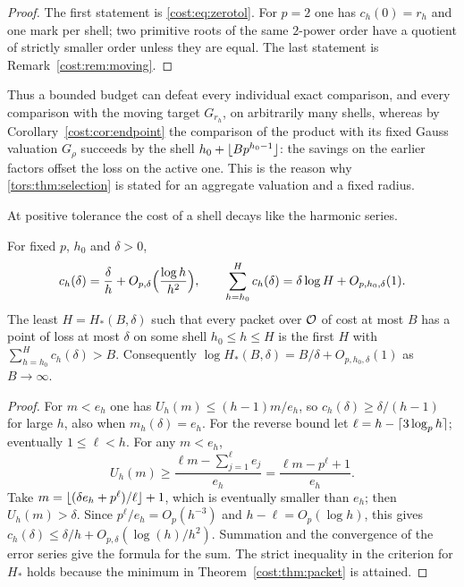 \begin{proof}
The first statement is \eqref{cost:eq:zerotol}. For $p=2$ one has $c_h(0)=r_h$ and one mark
per shell; two primitive roots of the same $2$-power order have a quotient of strictly
smaller order unless they are equal. The last statement is Remark~\ref{cost:rem:moving}.
\end{proof}

Thus a bounded budget can defeat every individual exact comparison, and every comparison
with the moving target $G_{r_h}$, on arbitrarily many shells, whereas by
Corollary~\ref{cost:cor:endpoint} the comparison of the product with its fixed Gauss valuation
$G_\rho$ succeeds by the shell $h_0+\lfloor Bp^{h_0-1}\rfloor$: the savings on the earlier factors
offset the loss on the active one. This is the reason why \cref{tors:thm:selection} is
stated for an aggregate valuation and a fixed radius.

At positive tolerance the cost of a shell decays like the harmonic series.

\begin{corollary}\label{cost:cor:depth}
For fixed $p$, $h_0$ and $\delta>0$,
\[
 c_h(\delta)=\frac\delta h+O_{p,\delta}\Bigl(\frac{\log h}{h^2}\Bigr),\qquad
 \sum_{h=h_0}^Hc_h(\delta)=\delta\log H+O_{p,h_0,\delta}(1).
\]
The least $H=H_*(B,\delta)$ such that every packet over $\mathcal{O}$ of cost at most $B$ has a point
of loss at most $\delta$ on some shell $h_0\le h\le H$ is the first $H$ with
$\sum_{h=h_0}^Hc_h(\delta)>B$. Consequently
$\log H_*(B,\delta)=B/\delta+O_{p,h_0,\delta}(1)$ as $B\to\infty$.
\end{corollary}

\begin{proof}
For $m<e_h$ one has $U_h(m)\le(h-1)m/e_h$, so $c_h(\delta)\ge\delta/(h-1)$ for large $h$,
also when $m_h(\delta)=e_h$. For the reverse bound let
$\ell=h-\lceil3\log_ph\rceil$; eventually $1\le\ell<h$. For any $m<e_h$,
\[
 U_h(m)\ge\frac{\ell m-\sum_{j=1}^\ell e_j}{e_h}=\frac{\ell m-p^\ell+1}{e_h}.
\]
Take $m=\lfloor(\delta e_h+p^\ell)/\ell\rfloor+1$, which is eventually smaller than $e_h$; then
$U_h(m)>\delta$. Since $p^\ell/e_h=O_p(h^{-3})$ and $h-\ell=O_p(\log h)$, this gives
$c_h(\delta)\le\delta/h+O_{p,\delta}(\log(h)/h^2)$. Summation and the convergence of the
error series give the formula for the sum. The strict inequality in the criterion for
$H_*$ holds because the minimum in Theorem~\ref{cost:thm:packet} is attained.
\end{proof}

